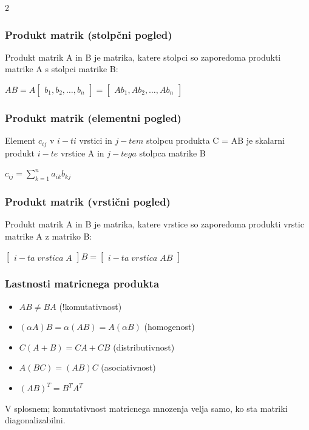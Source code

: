 \documentclass{article}
\begin{document}
\begin{multicols}{2}
	\subsubsection{Produkt matrik (stolpčni pogled)}

	Produkt matrik A in B je matrika, katere stolpci
	so zaporedoma produkti matrike A s stolpci matrike B:
	\begin{center}
		$AB = A
			\begin{bmatrix}
				b_{1}, b_{2}, \dots ,b_{n}
			\end{bmatrix} =
			\begin{bmatrix}
				Ab_{1}, Ab_{2}, \dots ,Ab_{n}
			\end{bmatrix}
		$
	\end{center}

	\subsubsection{Produkt matrik (elementni pogled)}

	Element $c_{ij}$ v $i-ti$ vrstici in $j-tem$ stolpcu
	produkta C = AB je skalarni produkt $i-te$ vrstice A in $j-tega$
	stolpca matrike B
	\begin{center}
		$c_{ij} =
			\sum_{k=1}^{n} a_{ik}b_{kj}
		$
	\end{center}

	\subsubsection{Produkt matrik (vrstični pogled)}

	Produkt matrik A in B je matrika, katere vrstice
	so zaporedoma produkti vrstic matrike A z matriko B:
	\begin{center}
		$
			\begin{bmatrix}
				i-ta\; vrstica\; A
			\end{bmatrix}B =
			\begin{bmatrix}
				i-ta\; vrstica\; AB
			\end{bmatrix}
		$
	\end{center}

	\subsubsection{Lastnosti matricnega produkta}

	\begin{itemize}
		\item $AB \neq BA$ (!komutativnost)
		\item $(\alpha A)B = \alpha (AB) = A( \alpha B)$ (homogenost)
		\item $C(A + B) = CA + CB$ (distributivnost)
		\item $A(BC) = (AB)C$ (asociativnost)
		\item $(AB)^{T} = B^{T}A^{T}$
	\end{itemize}
	V splosnem; komutativnost matricnega mnozenja velja
	samo, ko sta matriki diagonalizabilni.


\end{multicols}
\end{document}
